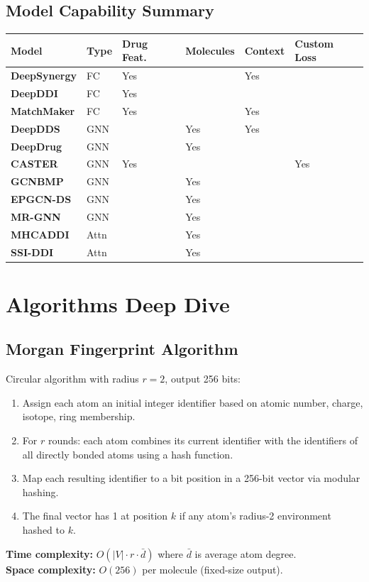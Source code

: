 \documentclass[12pt,a4paper,oneside]{book}
\begin{document}
\section{Model Capability Summary}

\begin{longtable}{>{\bfseries}p{2.8cm}p{1.8cm}p{2cm}p{2.2cm}p{2.4cm}p{2cm}}
\toprule
\textbf{Model} & \textbf{Type} & \textbf{Drug Feat.} & \textbf{Molecules} & \textbf{Context} & \textbf{Custom Loss} \\
\midrule\endhead
DeepSynergy & FC  & Yes & & Yes & \\
DeepDDI     & FC  & Yes & & & \\
MatchMaker  & FC  & Yes & & Yes & \\
DeepDDS     & GNN & & Yes & Yes & \\
DeepDrug    & GNN & & Yes & & \\
CASTER      & GNN & Yes & & & Yes \\
GCNBMP      & GNN & & Yes & & \\
EPGCN-DS    & GNN & & Yes & & \\
MR-GNN      & GNN & & Yes & & \\
MHCADDI     & Attn & & Yes & & \\
SSI-DDI     & Attn & & Yes & & \\
\bottomrule
\end{longtable}
\chapter{Algorithms Deep Dive}\label{chap:algorithms}

\section{Morgan Fingerprint Algorithm}
Circular algorithm with radius $r=2$, output 256 bits:
\begin{enumerate}
  \item Assign each atom an initial integer identifier based on atomic number, charge, isotope, ring membership.
  \item For $r$ rounds: each atom combines its current identifier with the identifiers of all directly bonded atoms using a hash function.
  \item Map each resulting identifier to a bit position in a 256-bit vector via modular hashing.
  \item The final vector has 1 at position $k$ if any atom's radius-2 environment hashed to $k$.
\end{enumerate}
\textbf{Time complexity:} $O(|V| \cdot r \cdot \bar{d})$ where $\bar{d}$ is average atom degree.\\
\textbf{Space complexity:} $O(256)$ per molecule (fixed-size output).
\end{document}
